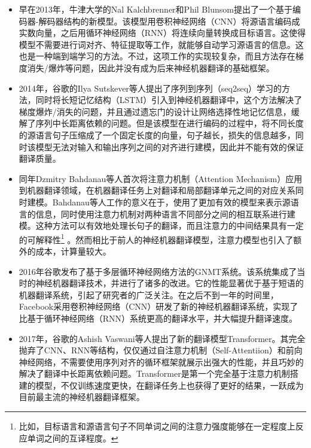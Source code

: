 \begin{itemize}
\vspace{0.3em}
\item 早在2013年，牛津大学的Nal Kalchbrenner和Phil Blunsom提出了一个基于编码器-解码器结构的新模型\cite{kalchbrenner-blunsom-2013-recurrent}。该模型用卷积神经网络（CNN）将源语言编码成实数向量，之后用循环神经网络（RNN）将连续向量转换成目标语言。这使得模型不需要进行词对齐、特征提取等工作，就能够自动学习源语言的信息。这也是一种端到端学习的方法。不过，这项工作的实现较复杂，而且方法存在梯度消失/爆炸等问题\cite{HochreiterThe,BENGIO1994Learning}，因此并没有成为后来神经机器翻译的基础框架。
\vspace{0.3em}
\item 2014年，谷歌的Ilya Sutskever等人提出了序列到序列（seq2seq）学习的方法，同时将长短记忆结构（LSTM）引入到神经机器翻译中，这个方法解决了梯度爆炸/消失的问题，并且通过遗忘门的设计让网络选择性地记忆信息，缓解了序列中长距离依赖的问题\cite{NIPS2014_5346}。但是该模型在进行编码的过程中，将不同长度的源语言句子压缩成了一个固定长度的向量，句子越长，损失的信息越多，同时该模型无法对输入和输出序列之间的对齐进行建模，因此并不能有效的保证翻译质量。
\vspace{0.3em}
\item 同年Dzmitry Bahdanau等人首次将注意力机制（Attention Mechanism）应用到机器翻译领域，在机器翻译任务上对翻译和局部翻译单元之间的对应关系同时建模\cite{bahdanau2014neural}。Bahdanau等人工作的意义在于，使用了更加有效的模型来表示源语言的信息，同时使用注意力机制对两种语言不同部分之间的相互联系进行建模。这种方法可以有效地处理长句子的翻译，而且注意力的中间结果具有一定的可解释性\footnote{比如，目标语言和源语言句子不同单词之间的注意力强度能够在一定程度上反应单词之间的互译程度。} 。然而相比于前人的神经机器翻译模型，注意力模型也引入了额外的成本，计算量较大。
\vspace{0.3em}
\item 2016年谷歌发布了基于多层循环神经网络方法的GNMT系统。该系统集成了当时的神经机器翻译技术，并进行了诸多的改进。它的性能显著优于基于短语的机器翻译系统\cite{Wu2016GooglesNM}，引起了研究者的广泛关注。在之后不到一年的时间里，Facebook采用卷积神经网络（CNN）研发了新的神经机器翻译系统\cite{DBLP:journals/corr/GehringAGYD17}，实现了比基于循环神经网络（RNN）系统更高的翻译水平，并大幅提升翻译速度。
\vspace{0.3em}
\item 2017年，谷歌的Ashish Vaswani等人提出了新的翻译模型Transformer。其完全抛弃了CNN、RNN等结构，仅仅通过自注意力机制（Self-Attentiion）和前向神经网络，不需要使用序列对齐的循环框架就展示出强大的性能，并且巧妙的解决了翻译中长距离依赖问题\cite{NIPS2017_7181}。Transformer是第一个完全基于注意力机制搭建的模型，不仅训练速度更快，在翻译任务上也获得了更好的结果，一跃成为目前最主流的神经机器翻译框架。
\vspace{0.3em}
\end{itemize}

